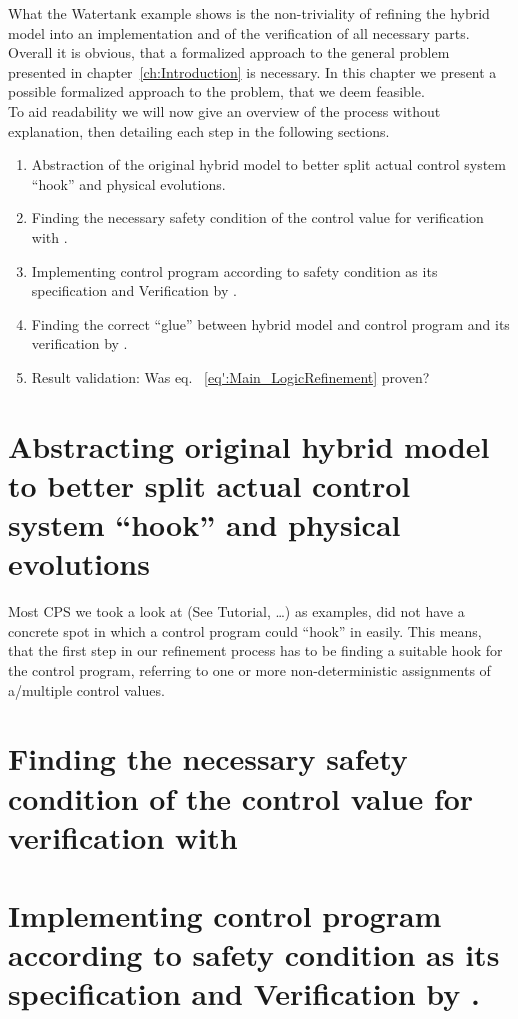 What the Watertank example shows is the non-triviality of refining the hybrid model into an implementation and of the verification of all necessary parts. Overall it is obvious, that a formalized approach to the general problem presented in chapter~\ref{ch:Introduction} is necessary. In this chapter we present a possible formalized approach to the problem, that we deem feasible.
\\

To aid readability we will now give an overview of the process without explanation, then detailing each step in the following sections. 

\begin{enumerate}
\item Abstraction of the original hybrid model to better split actual control system ``hook'' and physical evolutions.
\item Finding the necessary safety condition of the control value for verification with \keym.
\item Implementing control program according to safety condition as its specification and Verification by \key.
\item Finding the correct ``glue'' between hybrid model and control program and its verification by \keym.
\item Result validation: Was eq. ~\ref{eq':Main_LogicRefinement} proven?
\end{enumerate}

\section{Abstracting original hybrid model to better split actual control system ``hook'' and physical evolutions}
\label{sec:Process:Hook}
Most CPS we took a look at (See \cite{keymaera} Tutorial, \cite[p.~5, p.~11]{platzer2010b} \dots) as examples, did not have a concrete spot in which a control program could ``hook'' in easily. This means, that the first step in our refinement process has to be finding a suitable hook for the control program, referring to one or more non-deterministic assignments of a/multiple control values.

\section{Finding the necessary safety condition of the control value for verification with \keym}
\label{sec:Process:SafetyCond}

\section{Implementing control program according to safety condition as its specification and Verification by \key.}
\label{sec:Process:Implementation}

